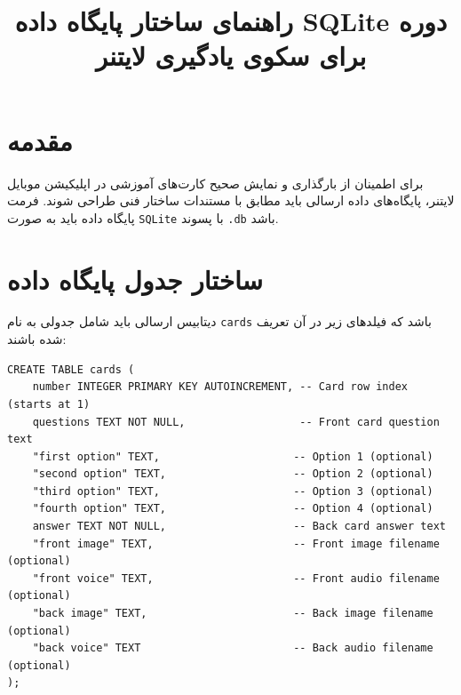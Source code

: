 \documentclass[12pt]{article}
\title{راهنمای ساختار پایگاه داده SQLite دوره برای سکوی یادگیری لایتنر}
\author{}
\date{}
\begin{document}
\maketitle

\section{مقدمه}
برای اطمینان از بارگذاری و نمایش صحیح کارت‌های آموزشی در اپلیکیشن موبایل لایتنر، پایگاه‌های داده ارسالی باید مطابق با مستندات ساختار فنی طراحی شوند. فرمت پایگاه داده باید به صورت \verb|SQLite| با پسوند \verb|.db| باشد.

\section{ساختار جدول پایگاه داده}
دیتابیس ارسالی باید شامل جدولی به نام \verb|cards| باشد که فیلدهای زیر در آن تعریف شده باشند:

\begin{latin}
\begin{verbatim}
CREATE TABLE cards (
    number INTEGER PRIMARY KEY AUTOINCREMENT, -- Card row index (starts at 1)
    questions TEXT NOT NULL,                  -- Front card question text
    "first option" TEXT,                     -- Option 1 (optional)
    "second option" TEXT,                    -- Option 2 (optional)
    "third option" TEXT,                     -- Option 3 (optional)
    "fourth option" TEXT,                    -- Option 4 (optional)
    answer TEXT NOT NULL,                    -- Back card answer text
    "front image" TEXT,                      -- Front image filename (optional)
    "front voice" TEXT,                      -- Front audio filename (optional)
    "back image" TEXT,                       -- Back image filename (optional)
    "back voice" TEXT                        -- Back audio filename (optional)
);
\end{verbatim}
\end{latin}
\end{document}
